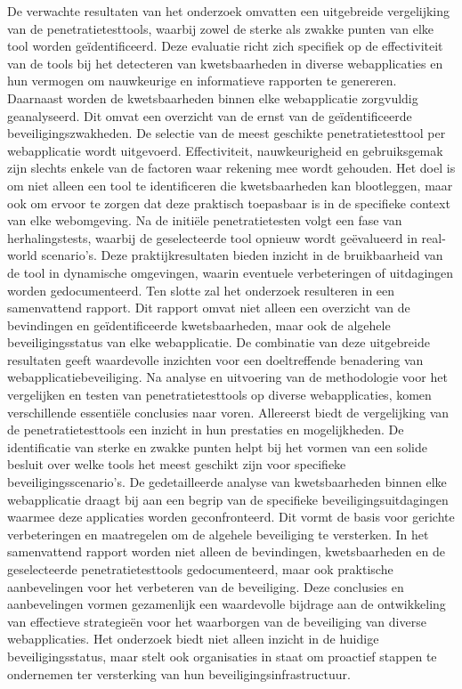 De verwachte resultaten van het onderzoek
omvatten een uitgebreide vergelijking van de penetratietesttools,
waarbij zowel de sterke als zwakke
punten van elke tool worden geïdentificeerd. Deze
evaluatie richt zich specifiek op de effectiviteit van
de tools bij het detecteren van kwetsbaarheden
in diverse webapplicaties en hun vermogen om
nauwkeurige en informatieve rapporten te genereren.
Daarnaast worden de kwetsbaarheden binnen
elke webapplicatie zorgvuldig geanalyseerd. Dit
omvat een overzicht van de ernst van de geïdentificeerde
beveiligingszwakheden.
De selectie van de meest geschikte penetratietesttool
per webapplicatie wordt uitgevoerd.
Effectiviteit, nauwkeurigheid en gebruiksgemak
zijn slechts enkele van de factoren waar rekening
mee wordt gehouden. Het doel is om niet alleen
een tool te identificeren die kwetsbaarheden kan
blootleggen, maar ook om ervoor te zorgen dat
deze praktisch toepasbaar is in de specifieke context
van elke webomgeving.
Na de initiële penetratietesten volgt een fase
van herhalingstests, waarbij de geselecteerde tool
opnieuw wordt geëvalueerd in real-world scenario’s.
Deze praktijkresultaten bieden inzicht in de
bruikbaarheid van de tool in dynamische omgevingen,
waarin eventuele verbeteringen of uitdagingen
worden gedocumenteerd.
Ten slotte zal het onderzoek resulteren in een
samenvattend rapport. Dit rapport omvat niet
alleen een overzicht van de bevindingen en geïdentificeerde
kwetsbaarheden, maar ook de algehele
beveiligingsstatus van elke webapplicatie.
De combinatie van deze uitgebreide resultaten
geeft waardevolle inzichten voor een doeltreffende
benadering van webapplicatiebeveiliging.
Na analyse en uitvoering van de methodologie
voor het vergelijken en testen van penetratietesttools
op diverse webapplicaties, komen verschillende
essentiële conclusies naar voren.
Allereerst biedt de vergelijking van de penetratietesttools
een inzicht in hun prestaties en
mogelijkheden. De identificatie van sterke en
zwakke punten helpt bij het vormen van een solide
besluit over welke tools het meest geschikt
zijn voor specifieke beveiligingsscenario’s.
De gedetailleerde analyse van kwetsbaarheden
binnen elke webapplicatie draagt bij aan een
begrip van de specifieke beveiligingsuitdagingen
waarmee deze applicaties worden geconfronteerd.
Dit vormt de basis voor gerichte verbeteringen en
maatregelen om de algehele beveiliging te versterken.
In het samenvattend rapport worden niet alleen
de bevindingen, kwetsbaarheden en de geselecteerde
penetratietesttools gedocumenteerd,
maar ook praktische aanbevelingen voor het verbeteren
van de beveiliging. Deze conclusies en
aanbevelingen vormen gezamenlijk een waardevolle
bijdrage aan de ontwikkeling van effectieve
strategieën voor het waarborgen van de beveiliging
van diverse webapplicaties. Het onderzoek
biedt niet alleen inzicht in de huidige beveiligingsstatus,
maar stelt ook organisaties in staat
om proactief stappen te ondernemen ter versterking
van hun beveiligingsinfrastructuur.
